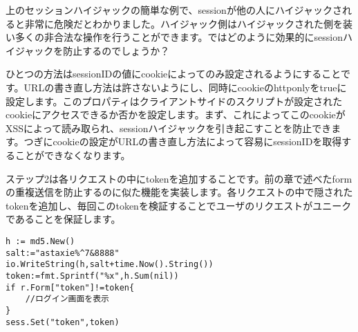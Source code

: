 上のセッションハイジャックの簡単な例で、sessionが他の人にハイジャックされると非常に危険だとわかりました。ハイジャック側はハイジャックされた側を装い多くの非合法な操作を行うことができます。ではどのように効果的にsessionハイジャックを防止するのでしょうか？

ひとつの方法はsessionIDの値にcookieによってのみ設定されるようにすることです。URLの書き直し方法は許さないようにし、同時にcookieのhttponlyをtrueに設定します。このプロパティはクライアントサイドのスクリプトが設定されたcookieにアクセスできるか否かを設定します。まず、これによってこのcookieがXSSによって読み取られ、sessionハイジャックを引き起こすことを防止できます。つぎにcookieの設定がURLの書き直し方法によって容易にsessionIDを取得することができなくなります。

ステップ2は各リクエストの中にtokenを追加することです。前の章で述べたformの重複送信を防止するのに似た機能を実装します。各リクエストの中で隠されたtokenを追加し、毎回このtokenを検証することでユーザのリクエストがユニークであることを保証します。

\begin{lstlisting}[numbers=none]
h := md5.New()
salt:="astaxie%^7&8888"
io.WriteString(h,salt+time.Now().String())
token:=fmt.Sprintf("%x",h.Sum(nil))
if r.Form["token"]!=token{
    //ログイン画面を表示
}
sess.Set("token",token)
\end{lstlisting}
